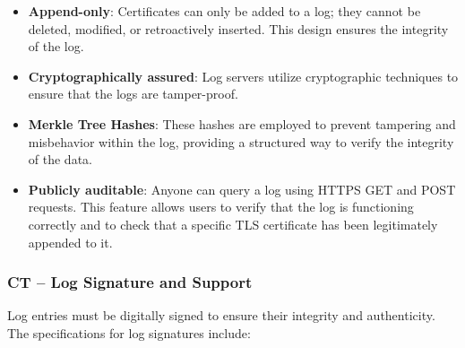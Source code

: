 \begin{itemize}
    \item \textbf{Append-only}: Certificates can only be added to a
      log; they cannot be deleted, modified, or retroactively
      inserted. This design ensures the integrity of the log.
    \item \textbf{Cryptographically assured}: Log servers utilize
      cryptographic techniques to ensure that the logs are
      tamper-proof.
    \item \textbf{Merkle Tree Hashes}: These hashes are employed to
      prevent tampering and misbehavior within the log, providing a
      structured way to verify the integrity of the data.
    \item \textbf{Publicly auditable}: Anyone can query a log using
      HTTPS GET and POST requests. This feature allows users to verify
      that the log is functioning correctly and to check that a
      specific TLS certificate has been legitimately appended to it.
\end{itemize}
\subsubsection{CT – Log Signature and Support}

Log entries must be digitally signed to ensure their integrity and
authenticity. The specifications for log signatures include:

